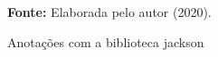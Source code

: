 \begin{figure}[ht!]
\centering

\caption{\textmd{Anotações com a biblioteca jackson}}
\label{fig:jsonjackson}

\par\medskip\textbf{Fonte:} Elaborada pelo autor (2020). \par\medskip

\end{figure}

